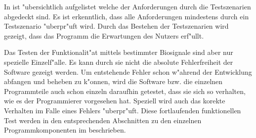 In  ist "ubersichtlich aufgelistet welche der Anforderungen durch die Testszenarien abgedeckt sind.
Es ist erkenntlich, dass alle Anforderungen mindestens durch ein Testszenario "uberpr"uft wird.
Durch das Bestehen der Testszenarien wird gezeigt, dass das Programm die Erwartungen des Nutzers erf"ullt.

Das Testen der Funktionalit"at mittels bestimmter Biosignale sind aber nur spezielle Einzelf"alle.
Es kann durch sie nicht die absolute Fehlerfreiheit der Software gezeigt werden.
Um entstehende Fehler schon w"ahrend der Entwicklung abfangen und beheben zu k"onnen, wird die Software bzw. die einzelnen Programmteile auch schon einzeln daraufhin getestet, dass sie sich so verhalten, wie es der Programmierer vorgesehen hat.
Speziell wird auch das korekte Verhalten im Falle eines Fehlers "uberpr"uft.
Diese fortlaufenden funktionellen Test werden in den entsprechenden Abschnitten zu den einzelnen Programmkomponenten im  beschrieben.

